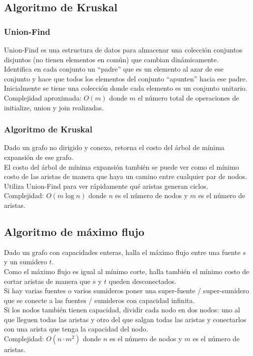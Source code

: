 \documentclass[10pt,letterpaper,twocolumn]{article}
\newcommand{\source}[1]{
	
	\dotfill
}
\begin{document}
	\subsection{Algoritmo de Kruskal}
		\subsubsection{Union-Find}
		Union-Find es una estructura de datos para almacenar una colección conjuntos disjuntos (no tienen elementos en común) que cambian dinámicamente.\\
		Identifica en cada conjunto un ``padre'' que es un elemento al azar de ese conjunto y hace que todos los elementos del conjunto ``apunten'' hacia ese padre. \\
		Inicialmente se tiene una colección donde cada elemento es un conjunto unitario.\\
		Complejidad aproximada: $O(m)$ donde $m$ el número total de operaciones de initialize, union y join realizadas.\\
		\source{./src/union-find.cpp}
		
		\subsubsection{Algoritmo de Kruskal}
		Dado un grafo no dirigido y conexo, retorna el costo del árbol de mínima expansión de ese grafo.\\
		El costo del árbol de mínima expansión también se puede ver como el mínimo costo de las aristas de manera que haya un camino entre cualquier par de nodos.\\
		Utiliza Union-Find para ver rápidamente qué aristas generan ciclos.\\
		Complejidad: $O(m\operatorname{log} n)$ donde $n$ es el número de nodos y $m$ es el número de aristas.\\
		\source{./src/kruskal.cpp}
		
	\subsection{Algoritmo de máximo flujo}
		Dado un grafo con capacidades enteras, halla el máximo flujo entre una fuente $s$ y un sumidero $t$.\\
		Como el máximo flujo es igual al mínimo corte, halla también el mínimo costo de cortar aristas de manera que $s$ y $t$ queden desconectados.\\
		Si hay varias fuentes o varios sumideros poner una super-fuente / super-sumidero que se conecte a las fuentes / sumideros con capacidad infinita.\\
		Si los nodos también tienen capacidad, dividir cada nodo en dos nodos: uno al que lleguen todas las aristas y otro del que salgan todas las aristas y conectarlos con una arista que tenga la capacidad del nodo.\\
		Complejidad: $O(n \cdot m^2)$ donde $n$ es el número de nodos y $m$ es el número de aristas.\\
		\source{./src/maxflow.cpp}
	
\end{document}
